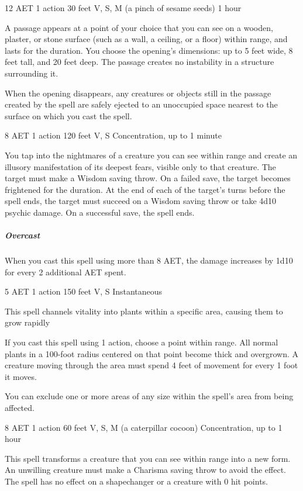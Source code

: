 \label{spell:passwall}
{12 AET}
{1 action}
{30 feet}
{V, S, M (a pinch of sesame seeds)}
{1 hour}

A passage appears at a point of your choice that you can see on a wooden, plaster, or stone surface (such as a wall, a ceiling, or a floor) within range, and lasts for the duration. You choose the opening's dimensions: up to 5 feet wide, 8 feet tall, and 20 feet deep. The passage creates no instability in a structure surrounding it.

When the opening disappears, any creatures or objects still in the passage created by the spell are safely ejected to an unoccupied space nearest to the surface on which you cast the spell.

\label{spell:phantasmal-killer}
{8 AET}
{1 action}
{120 feet}
{V, S}
{Concentration, up to 1 minute}

You tap into the nightmares of a creature you can see within range and create an illusory manifestation of its deepest fears, visible only to that creature. The target must make a Wisdom saving throw. On a failed save, the target becomes frightened for the duration. At the end of each of the target's turns before the spell ends, the target must succeed on a Wisdom saving throw or take 4d10 psychic damage. On a successful save, the spell ends.
\subparagraph*{Overcast} When you cast this spell using more than 8 AET, the damage increases by 1d10 for every 2 additional AET spent.

\label{spell:plant-growth}
{5 AET}
{1 action}
{150 feet}
{V, S}
{Instantaneous}

This spell channels vitality into plants within a specific area, causing them to grow rapidly

If you cast this spell using 1 action, choose a point within range. All normal plants in a 100-foot radius centered on that point become thick and overgrown. A creature moving through the area must spend 4 feet of movement for every 1 foot it moves.

You can exclude one or more areas of any size within the spell's area from being affected.

\label{spell:polymorph}
{8 AET}
{1 action}
{60 feet}
{V, S, M (a caterpillar cocoon)}
{Concentration, up to 1 hour}

This spell transforms a creature that you can see within range into a new form. An unwilling creature must make a Charisma saving throw to avoid the effect. The spell has no effect on a shapechanger or a creature with 0 hit points.

